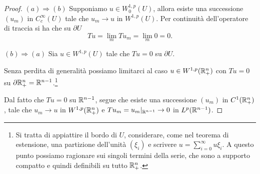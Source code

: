 \begin{proof}\hfill
	\par\noindent
	$(a) \Longrightarrow (b)$ Supponiamo $u \in W^{1,p}_0(U)$, allora esiste una successione $(u_m)$ in $C^\infty_c(U)$ tale che $u_m \to u$ in $W^{1,p}(U)$. Per continuità dell'operatore di traccia si ha che su $\partial U$ 
	\[ Tu = \lim\limits_{m} Tu_m = \lim\limits_{m} 0 = 0.  \]
	\par\noindent
	$(b) \Longrightarrow (a)$ Sia $u \in W^{1,p}(U)$ tale che $Tu = 0$ su $\partial U$. 
	
	Senza perdita di generalità possiamo limitarci al caso $u \in W^{1,p}(\mathbb{R}^n_{+})$ con $Tu = 0$ su $\partial\mathbb{R}^n_{+} = \mathbb{R}^{n-1} $.\footnote{Si tratta di appiattire il bordo di $U$, considerare, come nel teorema di estensione, una partizione dell'unità $(\xi_i)$ e scrivere $u = \sum_{i=0}^{\infty}u\xi_i$. A questo punto possiamo ragionare sui singoli termini della serie, che sono a supporto compatto e quindi definibili su tutto $\mathbb{R}^n_+$.}
	
	Dal fatto che $Tu = 0$ su $\mathbb{R}^{n-1} $, segue che esiste una successione $(u_m)$ in $C^1(\mathbb{R}^n_{+})$, tale che $u_m \to u$ in $W^{1,p}(\mathbb{R}^n_{+})$ e $Tu_m = u_m|_{\mathbb{R}^{n-1}} \to 0$ in $L^p(\mathbb{R}^{n-1})$.
	

\end{proof}

